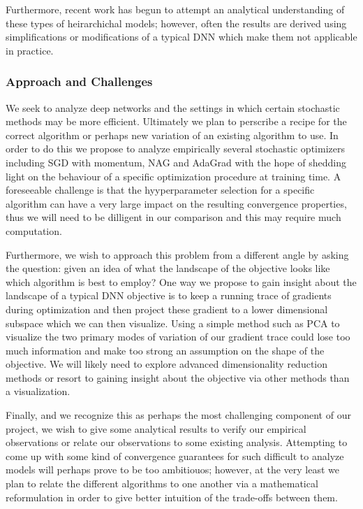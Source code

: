 \documentclass[12pt,english]{article}
\newcommand{\1}{\mathbb{I}} %
\begin{document}
Furthermore, recent work has begun to attempt an analytical understanding of
these types of heirarchichal models; however, often the results are derived using
simplifications or modifications of a typical DNN which make them not
applicable in practice. \cite{saxe_dl_dynamics} 

\subsubsection*{Approach and Challenges}

We seek to analyze deep networks and the settings in which certain stochastic
methods may be more efficient. Ultimately we plan to perscribe a recipe for the
correct algorithm or perhaps new variation of an existing algorithm to use. In
order to do this we propose to analyze empirically several stochastic
optimizers including SGD with momentum, NAG and AdaGrad with the hope of
shedding light on the behaviour of a specific optimization procedure at
training time. A foreseeable challenge is that the hyyperparameter selection for a specific algorithm can have a very large impact
on the resulting convergence properties, thus we will need to be dilligent in
our comparison and this may require much computation.

Furthermore, we wish to approach this problem from a different angle by asking the
question: given an idea of what the landscape of the objective looks like which
algorithm is best to employ? One way we propose to gain insight about the
landscape of a typical DNN objective is to keep a running trace of gradients
during optimization and then project these gradient to a lower dimensional
subspace which we can then visualize.  Using a simple method such as PCA to
visualize the two primary modes of variation of our gradient trace could lose
too much information and make too strong an assumption on the shape of the
objective. We will likely need to explore advanced dimensionality reduction
methods or resort to gaining insight about the objective via other methods than
a visualization.

Finally, and we recognize this as perhaps the most challenging component of our
project, we wish to give some analytical results to verify our empirical
observations or relate our observations to some existing analysis. Attempting
to come up with some kind of convergence guarantees for such difficult to
analyze models will perhaps prove to be too ambitiouos; however, at the very
least we plan to relate the different algorithms to one another via a
mathematical reformulation in order to give better intuition of the trade-offs
between them.

{}

\end{document}
